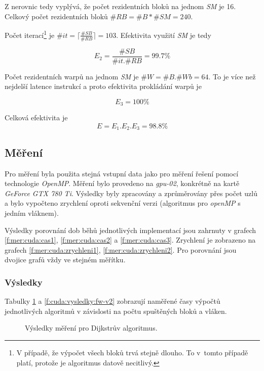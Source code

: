 Z nerovnic tedy vyplývá, že počet rezidentních bloků na jednom \emph{SM} je 16. Celkový počet rezidentních bloků $ \#RB = \#B * \#SM = 240 $.

Počet iterací\footnote{V případě, že výpočet všech bloků trvá stejně dlouho. To v~tomto případě platí, protože je algoritmus datově necitlivý.}
je $ \#it = \lceil \frac{\#SB}{\#RB} \rceil = 103 $. Efektivita využití \emph{SM} je tedy 

$$ E_2 = \frac{\#SB}{\#it . \#RB } = 99.7 \% $$

Počet rezidentních warpů na jednom \emph{SM} je  $ \#W = \#B . \#Wb = 64 $. To je více než nejdelší latence instrukcí a proto efektivita prokládání 
warpů je 

$$ E_3 = 100 \% $$


Celková efektivita je 
$$ E = E_1 . E_2 . E_3  = 98.8 \% $$

\subsection{Měření} \label{l:cuda:mereni}
Pro měření byla použita stejná vstupní data jako pro měření řešení pomocí technologie \emph{OpenMP}. Měření bylo provedeno na \emph{gpu-02}, konkrétně na kartě \emph{GeForce GTX 780 Ti}. Výsledky byly zpracovány a zprůměrovány přes počet uzlů a bylo vypočteno zrychlení oproti sekvenční verzi (algoritmus pro \emph{openMP} s jedním vláknem).

Výsledky porovnání dob běhů jednotlivých implementací jsou zahrnuty v grafech \ref{f:mer:cuda:cas1}, \ref{f:mer:cuda:cas2} a \ref{f:mer:cuda:cas3}. Zrychlení je zobrazeno na grafech \ref{f:mer:cuda:zrychleni1}, \ref{f:mer:cuda:zrychleni2}. Pro porovnání jsou dvojice grafů vždy ve stejném měřítku.

\subsubsection{Výsledky} \label{f:cuda:vysledky}
Tabulky \ref{f:cuda:vysledky:dijkstra} a \ref{f:cuda:vysledky:fw-v2} zobrazují naměřené časy výpočtů jednotlivých algoritmů v závislosti na počtu spuštěných bloků a vláken.

\begin{figure}
    \centering
    \caption{Výsledky měření pro Dijkstrův algoritmus.}
    \label{f:cuda:vysledky:dijkstra}
\end{figure}

